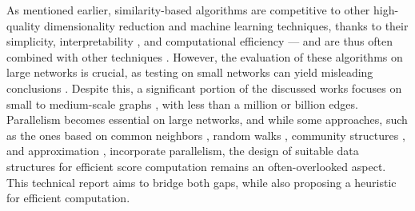 As mentioned earlier, similarity-based algorithms are competitive to other high-quality dimensionality reduction and machine learning techniques, thanks to their simplicity, interpretability \cite{pai2019netdx, barbieri2014follow}, and computational efficiency \cite{garcia2014link} --- and are thus often combined with other techniques \cite{kumari2022supervised, abuoda2020link, pai2019netdx}. However, the evaluation of these algorithms on large networks is crucial, as testing on small networks can yield misleading conclusions \cite{zhou2021progresses, zhou2021experimental}. Despite this, a significant portion of the discussed works focuses on small \cite{guo2019node, rafiee2020cndp, mumin2022efficient, papadimitriou2012fast, vega2021link, saifi2023fast, ferreira2019scalability, benhidour2022approach} to medium-scale graphs \cite{yang2015new, cui2016bounded, kalkanfinding, mohan2017scalable, wang2019link, bastami2019gravitation, shin2012multi, garcia2014link}, with less than a million or billion edges. Parallelism becomes essential on large networks, and while some approaches, such as the ones based on common neighbors \cite{yang2015new, cui2016bounded}, random walks \cite{papadimitriou2012fast}, community structures \cite{mohan2017scalable, wang2019link}, and approximation \cite{garcia2014link}, incorporate parallelism, the design of suitable data structures for efficient score computation remains an often-overlooked aspect. This technical report aims to bridge both gaps, while also proposing a heuristic for efficient computation.
